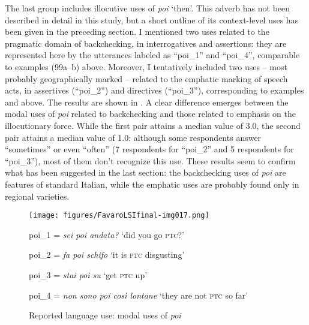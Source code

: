 The last group includes illocutive uses of \textit{poi} ‘then’. This adverb has not been described in detail in this study, but a short outline of its context-level uses has been given in the preceding section. I mentioned two uses related to the pragmatic domain of backchecking, in interrogatives and assertions: they are represented here by the utterances labeled as “poi\_1” and “poi\_4”, comparable to examples (99a–b) above. Moreover, I tentatively included two uses – most probably geographically marked – related to the emphatic marking of speech acts, in assertives (“poi\_2”) and directives (“poi\_3”), corresponding to examples  and  above. The results are shown in . A clear difference emerges between the modal uses of \textit{poi} related to backchecking and those related to emphasis on the illocutionary force. While the first pair attains a median value of 3.0, the second pair attains a median value of 1.0: although some respondents answer “sometimes” or even “often” (7 respondents for “poi\_2” and 5 respondents for “poi\_3”), most of them don’t recognize this use. These results seem to confirm what has been suggested in the last section: the backchecking uses of \textit{poi} are features of standard Italian, while the emphatic uses are probably found only in regional varieties.


\begin{figure}[t]
\texttt{[image: figures/FavaroLSIfinal-img017.png]}


{\raggedright\small
poi\_1 = \textit{sei poi andata?} ‘did you go \textsc{ptc}?’

poi\_2 = \textit{fa poi schifo} ‘it is \textsc{ptc} disgusting’

poi\_3 = \textit{stai poi su} ‘get \textsc{ptc} up’

poi\_4 = \textit{non sono poi così lontane} ‘they are not \textsc{ptc} so far’\par}

\caption{\label{fig:key:9.4} Reported language use: modal uses of \textit{poi}}
\end{figure}

